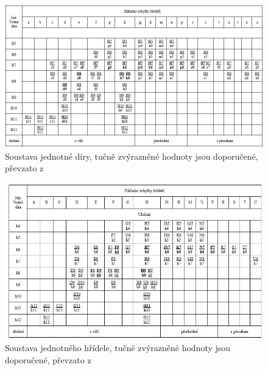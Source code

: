 \begin{figure}[htbp]
    \centering
    \includegraphics[width=1\textwidth]{img/jednotna-dira.JPG}
    \caption{Soustava jednotné díry, tučně zvýrazněné hodnoty jsou doporučené, převzato z~\cite{ELUC-DIRA}}
    \label{fig:jednotna-dira}
\end{figure}

\begin{figure}[htbp]
    \centering
    \includegraphics[width=1\textwidth]{img/jednotna-hridel.JPG}
    \caption{Soustava jednotného hřídele, tučně zvýrazněné hodnoty jsou doporučené, převzato z~\cite{ELUC-HRIDEL}}
    \label{fig:jednotna-hridel}
\end{figure}